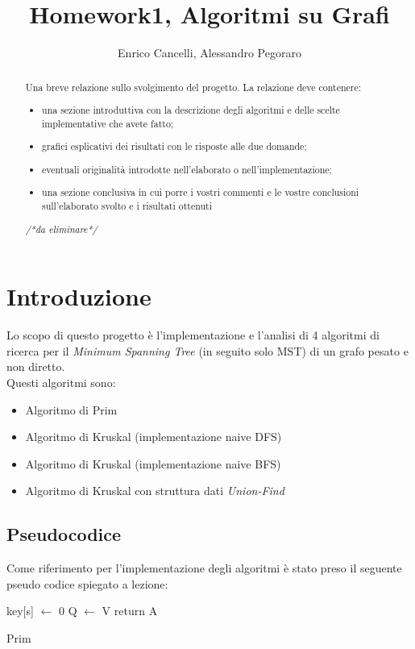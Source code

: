 \documentclass[]{article}
\title{Homework1, Algoritmi su Grafi}
\author{Enrico Cancelli, Alessandro Pegoraro}
\begin{document}
\maketitle

\begin{abstract}
	Una breve relazione sullo svolgimento del progetto. La relazione deve contenere:
	\begin{itemize}
		\item una sezione introduttiva con la descrizione degli algoritmi e delle scelte implementative che avete fatto;
		\item grafici esplicativi dei risultati con le risposte alle due domande;
		\item eventuali originalità introdotte nell'elaborato o nell'implementazione;
		\item una sezione conclusiva in cui porre i vostri commenti e le vostre conclusioni sull'elaborato svolto e i risultati ottenuti
	\end{itemize}
	\textit{/*da eliminare*/}
\end{abstract}

\section{Introduzione}
Lo scopo di questo progetto è l'implementazione e l'analisi di 4 algoritmi di ricerca per il \textit{Minimum Spanning Tree} (in seguito solo MST) di un grafo pesato e non diretto.\\
Questi algoritmi sono:
\begin{itemize}
	\item Algoritmo di Prim
	\item Algoritmo di Kruskal (implementazione naive DFS)
	\item Algoritmo di Kruskal (implementazione naive BFS)
	\item Algoritmo di Kruskal con struttura dati \textit{Union-Find}
\end{itemize}
\subsection{Pseudocodice}
Come riferimento per l'implementazione degli algoritmi è stato preso il seguente pseudo codice spiegato a lezione:\\
\begin{algorithm}[H]
	\SetAlgoLined
	\DontPrintSemicolon
	key[s] $\gets$ 0\;
	Q $\gets$ V\;
	return A\;
	\caption{Prim}
\end{algorithm}
\end{document}
